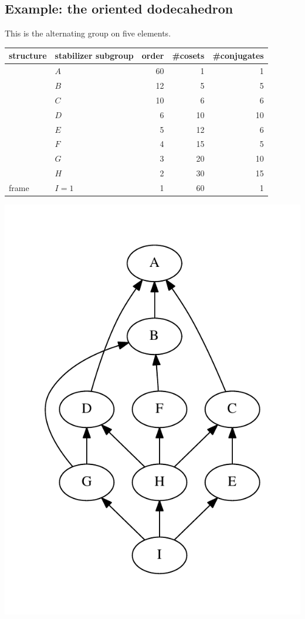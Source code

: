 \documentclass[11pt,oneside]{article}
\begin{document}
\subsection{Example: the oriented dodecahedron}

This is the alternating group on five elements.

\begin{samepage}
\begin{center}
\begin{tabular}{ |l|l|r|r|r| }
\hline
structure & stabilizer subgroup & order & \#cosets & \#conjugates \\
\hline
\hline
 & $A$ &       60        &  1      &   1         \\
\hline
 & $B$ &       12        &  5      &   5         \\
\hline
 & $C$ &       10        &  6      &   6         \\
\hline
 & $D$ &       6        &  10      &   10         \\
\hline
 & $E$ &       5        &  12      &   6      \\
\hline
 & $F$ &       4        &  15      &   5     \\
\hline
 & $G$ &       3        &  20      &   10    \\
\hline
 & $H$ &       2        &  30      &   15         \\
\hline
frame & $I=1$ &       1        &  60      &   1       \\
\hline
\end{tabular}
\end{center}
\end{samepage}

\begin{center}
\includegraphics[width=0.4\columnwidth]{subgroups_alt5.pdf} 
\end{center}
\end{document}
